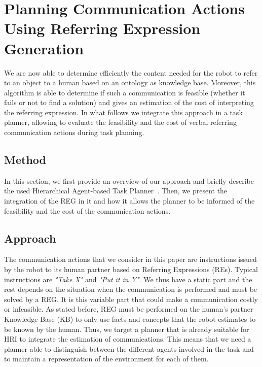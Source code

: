 \documentclass[a4paper,11pt,twoside]{StyleThese}
\begin{document}
\section[Using REG in Task Planning]{Planning Communication Actions Using Referring Expression Generation}

We are now able to determine efficiently the content needed for the robot to refer to an object to a human based on an ontology as knowledge base. Moreover, this algorithm is able to determine if such a communication is feasible (whether it fails or not to find a solution) and gives an estimation of the cost of interpreting the referring expression. In what follows we integrate this approach in a task planner, allowing to evaluate the feasibility and the cost of verbal referring communication actions during task planning.

\subsection{Method}
\label{sec:Integration}

In this section, we first provide an overview of our approach and briefly describe the used Hierarchical Agent-based Task Planner~\cite{lallement2014hatp}. Then, we present the integration of the REG in it and how it allows the planner to be informed of the feasibility and the cost of the communication actions.

\subsection{Approach}


The communication actions that we consider in this paper are instructions issued by the robot to its human partner based on Referring Expressions (REs). Typical instructions are \textit{"Take X"} and \textit{"Put it in Y"}. We thus have a static part and the rest depends on the situation when the communication is performed and must be solved by a REG. It is this variable part that could make a communication costly or infeasible. As stated before, REG must be performed on the human's partner Knowledge Base (KB) to only use facts and concepts that the robot estimates to be known by the human. Thus, we target a planner that is already suitable for HRI to integrate the estimation of communications. This means that we need a planner able to distinguish between the different agents involved in the task and to maintain a representation of the environment for each of them.
\end{document}
